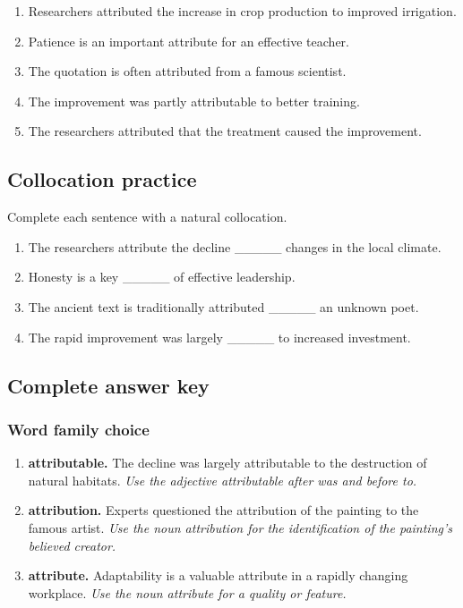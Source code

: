 \documentclass[11pt]{article}
\begin{document}
\begin{enumerate}
  \item Researchers attributed the increase in crop production to improved irrigation.
  \item Patience is an important attribute for an effective teacher.
  \item The quotation is often attributed from a famous scientist.
  \item The improvement was partly attributable to better training.
  \item The researchers attributed that the treatment caused the improvement.
\end{enumerate}

\subsection{Collocation practice}
Complete each sentence with a natural collocation.

\begin{enumerate}
  \item The researchers attribute the decline \_\_\_\_\_ changes in the local climate.
  \item Honesty is a key \_\_\_\_\_ of effective leadership.
  \item The ancient text is traditionally attributed \_\_\_\_\_ an unknown poet.
  \item The rapid improvement was largely \_\_\_\_\_ to increased investment.
\end{enumerate}

\subsection{Complete answer key}
\subsubsection{Word family choice}
\begin{enumerate}
  \item \textbf{attributable.} The decline was largely attributable to the destruction of natural habitats. \emph{Use the adjective attributable after was and before to.}
  \item \textbf{attribution.} Experts questioned the attribution of the painting to the famous artist. \emph{Use the noun attribution for the identification of the painting's believed creator.}
  \item \textbf{attribute.} Adaptability is a valuable attribute in a rapidly changing workplace. \emph{Use the noun attribute for a quality or feature.}
\end{enumerate}
\end{document}
